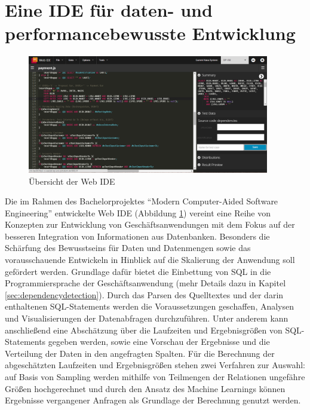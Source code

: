 \section{Eine IDE f{\"u}r daten- und performancebewusste Entwicklung}\label{chap:entwicklungsumgebung}

%
%

\begin{figure}[ht]
	\centering
  \includegraphics[width=0.94\textwidth]{figures/ide.png}
	\caption{Übersicht der Web IDE}
	\label{fig:ide}
\end{figure}

Die im Rahmen des Bachelorprojektes ``Modern Computer-Aided Software Engineering'' entwickelte Web IDE (Abbildung \ref{fig:ide}) vereint eine Reihe von Konzepten zur Entwicklung von Geschäftsanwendungen mit dem Fokus auf der besseren Integration von Informationen aus Datenbanken.
Besonders die Schärfung des Bewusstseins für Daten und Datenmengen sowie das vorausschauende Entwickeln in Hinblick auf die Skalierung der Anwendung soll gefördert werden.
Grundlage dafür bietet die Einbettung von SQL in die Programmiersprache der Geschäftsanwendung \cite{Horschig2014} (mehr Details dazu in Kapitel \ref{sec:dependencydetection}).
Durch das Parsen des Quelltextes und der darin enthaltenen SQL-Statements \cite{Schulz2014} werden die Voraussetzungen geschaffen, Analysen und Visualisierungen der Datenabfragen durchzuführen.
Unter anderem kann anschließend eine Abschätzung über die Laufzeiten und Ergebnisgrößen von SQL-Statements gegeben werden, sowie eine Vorschau der Ergebnisse und die Verteilung der Daten in den angefragten Spalten.
Für die Berechnung der abgeschätzten Laufzeiten und Ergebnisgrößen stehen zwei Verfahren zur Auswahl: auf Basis von Sampling \cite{Exner2014} werden mithilfe von Teilmengen der Relationen ungefähre Größen hochgerechnet und durch den Ansatz des Machine Learnings \cite{Mues2014} können Ergebnisse vergangener Anfragen als Grundlage der Berechnung genutzt werden.


